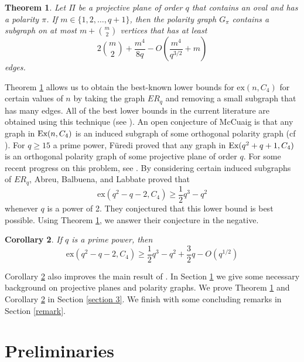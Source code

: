 \documentclass[12pt]{article}
\newtheorem{theorem}{Theorem}[section]
\newtheorem{corollary}[theorem]{Corollary}
\begin{document}
\begin{theorem}\label{crass subgraph}
    Let $\Pi$ be a projective plane of order $q$ that contains an oval and has a polarity $\pi$.  If $m \in \{1,2, \dots , q + 1 \}$, then the polarity graph $G_{ \pi}$ contains a subgraph on at most $m + \binom{m}{2}$ vertices that has at least
    $$ 2 \binom{m}{2} + \frac{m^4}{8q} - O \left( \frac{m^4}{q^{3/2} } + m \right) $$
    edges.
\end{theorem}

Theorem \ref{crass subgraph} allows us to obtain the best-known lower bounds for $\mathrm{ex}(n, C_4)$ for certain values of $n$ by taking the graph $ER_q$ and removing a small subgraph that has many edges.  All of the best lower bounds in the current literature are obtained using this technique (see \cite{abreu2010adjacency, firke2013extremal, tait2013sidon}).  An open conjecture of McCuaig is that
any graph in $\textup{Ex}(n , C_4)$ is an induced subgraph of some orthogonal polarity graph (cf \cite{furedi1994quadrilateral}).  For $q \geq 15$ a prime power, F\"{u}redi \cite{furedi1996number} proved that any graph in $\textup{Ex}( q^2 + q + 1 , C_4)$ is an orthogonal polarity graph of some projective plane of order $q$.  For some recent progress on this problem, see \cite{firke2013extremal}.
By considering certain induced subgraphs of $ER_q$, Abreu, Balbuena, and Labbate \cite{abreu2010adjacency} proved that
$$ \mathrm{ex}(q^2-q-2, C_4) \geq \frac{1}{2}q^3 - q^2 $$
whenever $q$ is a power of 2.  They conjectured that this lower bound is best possible.
Using Theorem \ref{crass subgraph}, we answer their conjecture in the negative.

\begin{corollary}\label{speculate}
    If $q$ is a prime power, then
    $$ \mathrm{ex}(q^2 - q - 2, C_4) \geq \frac{1}{2}q^3 - q^2 + \frac{3}{2}q - O\left(q^{1/2}\right) $$
\end{corollary}

Corollary \ref{speculate} also improves the main result of \cite{tait2013sidon}.
In Section \ref{section 2} we give some necessary background on projective planes and polarity graphs. We prove
Theorem \ref{crass subgraph} and Corollary \ref{speculate} in Section \ref{section 3}.  We finish with some concluding remarks in Section \ref{remark}.

\section{Preliminaries}\label{section 2}
\end{document}
